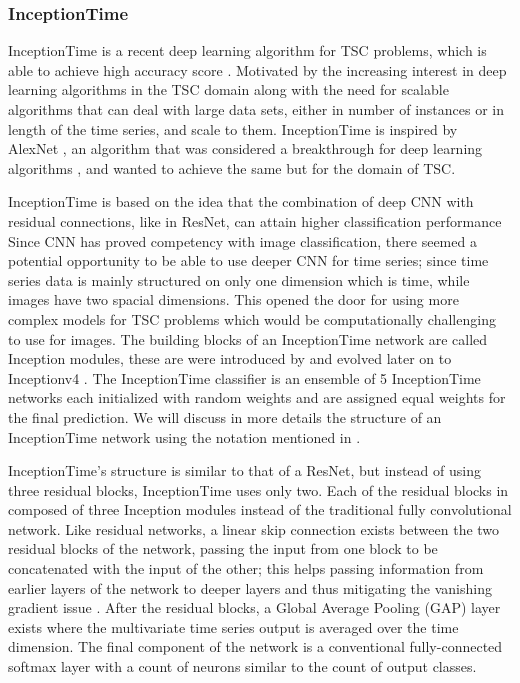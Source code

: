 \subsubsection{InceptionTime}
\label{SubsubsectionInception}
InceptionTime \cite{fawaz2020inceptiontime} is a recent deep learning algorithm for TSC problems, which is able to achieve high accuracy score \cite{ruiz2020great}.
Motivated by the increasing interest in deep learning algorithms in the TSC domain along with the need for scalable algorithms
that can deal with large data sets, either in number of instances or in length of the time series, and scale to them.
InceptionTime is inspired by AlexNet \cite{krizhevsky2012imagenet}, an algorithm that was considered a breakthrough for deep learning algorithms \cite{alom2018history},
and wanted to achieve the same but for the domain of TSC.

InceptionTime is based on the idea that the combination of deep CNN with residual connections, like in ResNet, can attain higher classification performance \cite{fawaz2019deepreview}
Since CNN has proved competency with image classification, there seemed a potential opportunity to be able to use deeper CNN for time series;
since time series data is mainly structured on only one dimension which is time, while images have two spacial dimensions.
This opened the door for using more complex models for TSC problems which would be computationally challenging to use for images.
The building blocks of an InceptionTime network are called Inception modules, these are were introduced by \cite{szegedy2015going} and evolved later on to Inceptionv4 \cite{szegedy2017inception}.
The InceptionTime classifier is an ensemble of 5 InceptionTime networks each initialized with random weights and are assigned equal weights for the final prediction.
We will discuss in more details the structure of an InceptionTime network using the notation mentioned in \cite{fawaz2020inceptiontime}.

InceptionTime's structure is similar to that of a ResNet, but instead of using three residual blocks, InceptionTime uses only two.
Each of the residual blocks in composed of three Inception modules instead of the traditional fully convolutional network.
Like residual networks, a linear skip connection exists between the two residual blocks of the network, passing the input from one block to be concatenated with the input of the other;
this helps passing information from earlier layers of the network to deeper layers and thus mitigating the vanishing gradient issue \cite{he2016deep}.
After the residual blocks, a Global Average Pooling (GAP) layer exists where the multivariate time series output is averaged over the time dimension.
The final component of the network is a conventional fully-connected softmax layer with a count of neurons similar to the count of output classes.

